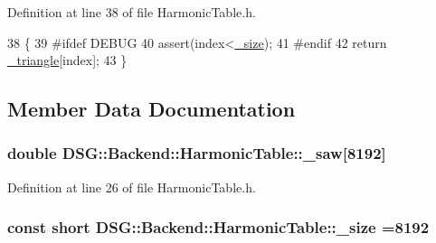 Definition at line 38 of file Harmonic\+Table.\+h.


\begin{DoxyCode}
38                                                                                \{
39 \textcolor{preprocessor}{#ifdef DEBUG}
40             assert(index<\hyperlink{classDSG_1_1Backend_1_1HarmonicTable_a478d8f277438567c219780d3bd372566}{\_size});
41 \textcolor{preprocessor}{#endif}
42             \textcolor{keywordflow}{return} \hyperlink{classDSG_1_1Backend_1_1HarmonicTable_a70d00f8d0ad9a244ebf4a8784a69ec33}{\_triangle}[index];
43         \}
\end{DoxyCode}


\subsection{Member Data Documentation}
\hypertarget{classDSG_1_1Backend_1_1HarmonicTable_ad5d0c429c75e41c83c098fcab28cfb8c}{
\subsubsection[{\+\_\+saw}]{\setlength{\rightskip}{0pt plus 5cm}double D\+S\+G\+::\+Backend\+::\+Harmonic\+Table\+::\+\_\+saw\mbox{[}8192\mbox{]}\hspace{0.3cm}{\ttfamily [protected]}}}\label{classDSG_1_1Backend_1_1HarmonicTable_ad5d0c429c75e41c83c098fcab28cfb8c}


Definition at line 26 of file Harmonic\+Table.\+h.

\hypertarget{classDSG_1_1Backend_1_1HarmonicTable_a478d8f277438567c219780d3bd372566}{
\subsubsection[{\+\_\+size}]{\setlength{\rightskip}{0pt plus 5cm}const short D\+S\+G\+::\+Backend\+::\+Harmonic\+Table\+::\+\_\+size =8192\hspace{0.3cm}{\ttfamily [protected]}}}\label{classDSG_1_1Backend_1_1HarmonicTable_a478d8f277438567c219780d3bd372566}


